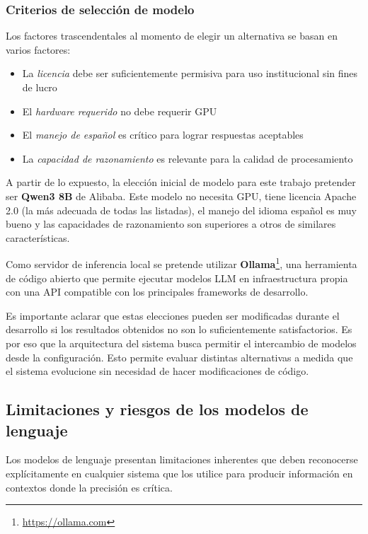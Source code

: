 \documentclass[
  spanish,
]{article}
\begin{document}
\medskip

\subsubsection*{Criterios de selección de modelo}

Los factores trascendentales al momento de elegir un alternativa se basan en varios factores:

\begin{itemize}
  \item La \emph{licencia} debe ser suficientemente permisiva para uso institucional sin fines de lucro
  \item El \emph{hardware requerido} no debe requerir GPU
  \item El \emph{manejo de español} es crítico para lograr respuestas aceptables
  \item La \emph{capacidad de razonamiento} es relevante para la calidad de procesamiento
\end{itemize}

A partir de lo expuesto, la elección inicial de modelo para este trabajo pretender ser \textbf{Qwen3 8B} de Alibaba.
Este modelo no necesita GPU, tiene licencia Apache 2.0 (la más adecuada de todas las listadas),
el manejo del idioma español es muy bueno y las capacidades de razonamiento son superiores a otros
de similares características.

Como servidor de inferencia local se pretende utilizar \textbf{Ollama}\footnote{\url{https://ollama.com}},
una herramienta de código abierto que permite ejecutar modelos LLM en infraestructura propia
con una API compatible con los principales frameworks de desarrollo.

Es importante aclarar que estas elecciones pueden ser modificadas durante el desarrollo si
los resultados obtenidos no son lo suficientemente satisfactorios. Es por eso que
la arquitectura del sistema busca permitir el intercambio de modelos desde la configuración.
Esto permite evaluar distintas alternativas a medida que el sistema evolucione sin necesidad
de hacer modificaciones de código.

\subsection{Limitaciones y riesgos de los modelos de lenguaje}\label{limitaciones-riesgos}

Los modelos de lenguaje presentan limitaciones inherentes que deben reconocerse explícitamente
en cualquier sistema que los utilice para producir información en contextos donde la precisión es crítica.
\end{document}

